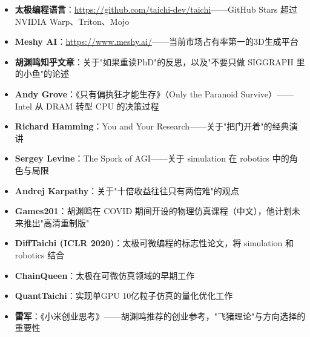 \documentclass[a4paper]{article}
\begin{document}
\begin{itemize}
\item \textbf{太极编程语言}：\url{https://github.com/taichi-dev/taichi}——GitHub Stars 超过 NVIDIA Warp、Triton、Mojo
\item \textbf{Meshy AI}：\url{https://www.meshy.ai/}——当前市场占有率第一的3D生成平台
\item \textbf{胡渊鸣知乎文章}：关于"如果重读PhD"的反思，以及"不要只做 SIGGRAPH 里的小鱼"的论述
\item \textbf{Andy Grove}：《只有偏执狂才能生存》（Only the Paranoid Survive）——Intel 从 DRAM 转型 CPU 的决策过程
\item \textbf{Richard Hamming}：You and Your Research——关于"把门开着"的经典演讲
\item \textbf{Sergey Levine}：The Spork of AGI——关于 simulation 在 robotics 中的角色与局限
\item \textbf{Andrej Karpathy}：关于"十倍收益往往只有两倍难"的观点
\item \textbf{Games201}：胡渊鸣在 COVID 期间开设的物理仿真课程（中文），他计划未来推出"高清重制版"
\item \textbf{DiffTaichi (ICLR 2020)}：太极可微编程的标志性论文，将 simulation 和 robotics 结合
\item \textbf{ChainQueen}：太极在可微仿真领域的早期工作
\item \textbf{QuantTaichi}：实现单GPU 10亿粒子仿真的量化优化工作
\item \textbf{雷军}：《小米创业思考》——胡渊鸣推荐的创业参考，"飞猪理论"与方向选择的重要性
\end{itemize}

\end{document}
